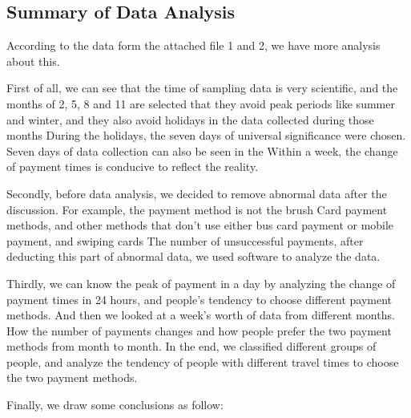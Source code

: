 \documentclass[../mcmpaper]{subfiles}
\begin{document}
\subsection{Summary of Data Analysis}
\indent{}According to the data form the attached file 1 and 2, we have more analysis about this.
\par
First of all, we can see that the time of sampling data is very scientific, and the months of 2, 5, 8 and 11 are selected that they avoid peak periods like summer and winter, and they also avoid holidays in the data collected during those months During the holidays, the seven days of universal significance were chosen. Seven days of data collection can also be seen in the Within a week, the change of payment times is conducive to reflect the reality.
\par
Secondly, before data analysis, we decided to remove abnormal data after the discussion. For example, the payment method is not the brush Card payment methods, and other methods that don't use either bus card payment or mobile payment, and swiping cards The number of unsuccessful payments, after deducting this part of abnormal data, we used software to analyze the data.
\par
Thirdly, we can know the peak of payment in a day by analyzing the change of payment times in 24 hours, and people's tendency to choose different payment methods. And then we looked at a week's worth of data from different months. How the number of payments changes and how people prefer the two payment methods from month to month. In the end, we classified different groups of people, and analyze the tendency of people with different travel times to choose the two payment methods.
\par
Finally, we draw some conclusions as follow:
\end{document}
